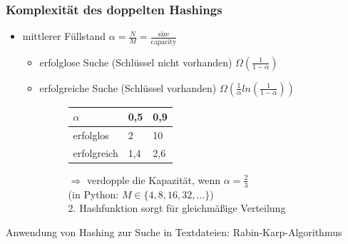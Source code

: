 \subsubsection*{Komplexität des doppelten Hashings}
\begin{itemize}
    \item mittlerer Füllstand $\alpha = \frac{N}{M} = \frac{\text{size}}{\text{capacity}}$
    \begin{itemize}
        \item erfolglose Suche (Schlüssel nicht vorhanden) \hspace*{5mm}$\Omega(\frac{1}{1-\alpha})$
        \item erfolgreiche Suche (Schlüssel vorhanden) \hspace*{5mm}$\Omega(\frac{1}{\alpha} ln(\frac{1}{1-\alpha}))$
        \begin{figure}[htbp]
            \begin{minipage}[t]{7cm}
                \centering
                \vspace{0cm}
                \begin{tabular}{C{2.5cm}|C{1.3cm}|C{1.3cm}|}
                    $\alpha$ & 0,5 & 0,9 \\ \hline
                    erfolglos & 2 & 10 \\
                    erfolgreich & 1,4 & 2,6
                \end{tabular}
            \end{minipage}
            \begin{minipage}[t]{8cm}
                $\Rightarrow$ verdopple die Kapazität, wenn $\alpha = \frac{2}{3}$ \\
                (in Python: $M \in \{4, 8, 16, 32, ...\}$) \\
                2. Hashfunktion sorgt für gleichmäßige Verteilung
            \end{minipage}
        \end{figure}
    \end{itemize}
\end{itemize}
Anwendung von Hashing zur Suche in Textdateien: Rabin-Karp-Algorithmus
